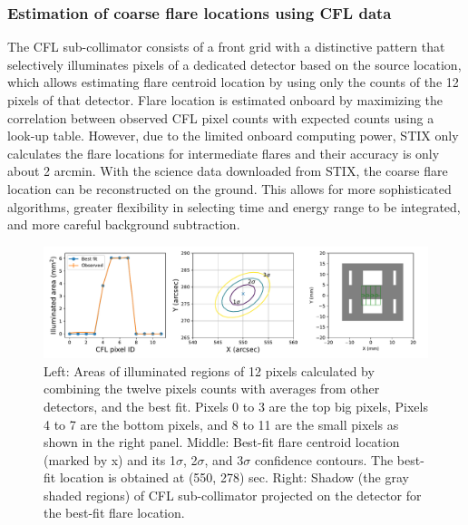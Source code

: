 \documentclass[referee]{aa} %
\begin{document}
\subsubsection{Estimation of coarse flare locations using CFL data}
The CFL sub-collimator consists of a front grid with
a distinctive pattern that selectively illuminates pixels of a 
dedicated detector based on the source location, which allows
estimating flare centroid location by using only the counts of the 12 pixels 
of that detector. 
Flare location is estimated onboard by maximizing the correlation between observed CFL pixel counts 
with expected counts using a look-up table. 
However, due to the limited onboard computing power,
STIX only calculates the flare locations for intermediate flares 
and their accuracy is only about 2 arcmin. 
With the science data downloaded from STIX,
the coarse flare location can be reconstructed on the ground. 
This allows for more sophisticated algorithms, greater flexibility in selecting time and energy 
range to be integrated, and more careful background subtraction.

\begin{figure}
  \centering
  \includegraphics[width=0.95\linewidth]{figures/cflMay07.pdf}
  \caption{
   Left: Areas of illuminated regions of 12 pixels calculated by combining
  the twelve pixels counts with averages from other detectors, and the best fit. 
  Pixels 0 to 3 are the top big pixels, Pixels 4 to 7 are the bottom pixels, and 8 to 11 are the small pixels as shown in the right panel.
   Middle: Best-fit flare centroid location (marked by x) and its 1$\sigma$, 2$\sigma$, and 3$\sigma$ confidence contours.
   The best-fit location is obtained at (550, 278) sec. 
    Right:  Shadow (the gray shaded regions) of CFL sub-collimator projected on the detector 
  for the best-fit flare location. }
  \label{fig:cfl}
\end{figure}
\end{document}
